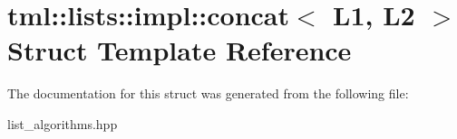 \hypertarget{structtml_1_1lists_1_1impl_1_1concat}{\section{tml\+:\+:lists\+:\+:impl\+:\+:concat$<$ L1, L2 $>$ Struct Template Reference}
\label{structtml_1_1lists_1_1impl_1_1concat}
}


The documentation for this struct was generated from the following file\+:\begin{DoxyCompactItemize}
\item 
list\+\_\+algorithms.\+hpp\end{DoxyCompactItemize}

